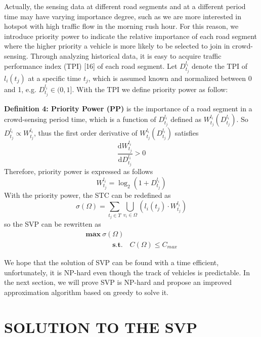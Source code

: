 \documentclass[journal]{IEEEtran}
\begin{document}
Actually, the sensing data at different road segments and at a different period time may have varying importance degree, such as we are more interested in hotspot with high traffic flow in the morning rush hour. For this reason, we introduce priority power to indicate the relative importance of each road segment where the higher priority a vehicle is more likely to be selected to join in crowd-sensing. Through analyzing historical data, it is easy to acquire traffic performance index (TPI) [16] of each road segment. Let $D_{t_{j}}^{l_{i}}$ denote the TPI of $l_{i} (t_{j})$ at a specific time $t_{j}$, which is assumed known and normalized between 0 and 1, e.g. $D_{t_{j}}^{l_{i}}\in (0,1]$. With the TPI we define priority power as follow:

\noindent
\textbf{Definition 4: Priority Power (PP)} is the importance of a road segment in a crowd-sensing period time, which is a function of  $D_{t_{j}}^{l_{i}}$ defined as $W_{t_{j}}^{l_{i}}(D_{t_{j}}^{l_{i}})$. So $D_{t_{j}}^{l_{i}}\propto W_{t_{j}}^{l_{i}}$, thus the first order derivative of $W_{t_{j}}^{l_{i}}(D_{t_{j}}^{l_{i}})$ satisfies
\begin{equation}
\frac{\mathrm{d}W_{t_{j}}^{l_{i}} }{\mathrm{d}D_{t_{j}}^{l_{i}}}> 0
\end{equation}
Therefore, priority power is expressed as follows
\begin{equation}
W_{t_{j}}^{l_{i}}=\log_{2}(1+D_{t_{j}}^{l_{i}})
\end{equation}
With the priority power, the STC can be redefined as
\begin{equation}
\sigma (\Omega )=\sum_{t_{j}\in T}\bigcup_{v_{i}\in \Omega }(l_{i}(t_{j})\cdot W_{t_{j}}^{l_{i}})
\end{equation}
so the SVP can be rewritten as
\begin{equation}
\begin{matrix}
\textbf{max}\  \sigma(\Omega)\\\quad\quad\quad\;\;\
\textbf{s.t.}\quad C(\Omega)\leqslant C_{max}\end{matrix}
\end{equation}

We hope that the solution of SVP can be found with a time efficient, unfortunately, it is NP-hard even though the track of vehicles is predictable. In the next section, we will prove SVP is NP-hard and propose an improved approximation algorithm based on greedy to solve it.
\section{SOLUTION TO THE SVP}
\end{document}

